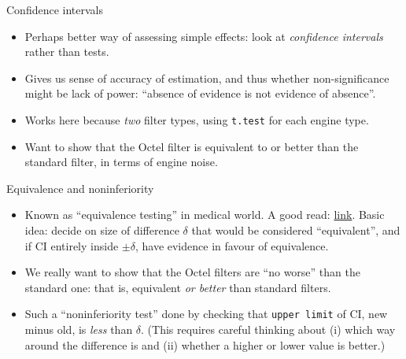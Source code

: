 \documentclass[ignorenonframetext,]{beamer}
\begin{document}
\begin{frame}[fragile]{Confidence intervals}
\protect\hypertarget{confidence-intervals}{}

\begin{itemize}
\item
  Perhaps better way of assessing simple effects: look at
  \emph{confidence intervals} rather than tests.
\item
  Gives us sense of accuracy of estimation, and thus whether
  non-significance might be lack of power: ``absence of evidence is not
  evidence of absence''.
\item
  Works here because \emph{two} filter types, using \texttt{t.test} for
  each engine type.
\item
  Want to show that the Octel filter is equivalent to or better than the
  standard filter, in terms of engine noise.
\end{itemize}

\end{frame}

\begin{frame}[fragile]{Equivalence and noninferiority}
\protect\hypertarget{equivalence-and-noninferiority}{}

\begin{itemize}
\item
  Known as ``equivalence testing'' in medical world. A good read:
  \href{http://www.ncbi.nlm.nih.gov/pmc/articles/PMC3019319/}{link}.
  Basic idea: decide on size of difference \(\delta\) that would be
  considered ``equivalent'', and if CI entirely inside \(\pm \delta\),
  have evidence in favour of equivalence.
\item
  We really want to show that the Octel filters are ``no worse'' than
  the standard one: that is, equivalent \emph{or better} than standard
  filters.
\item
  Such a ``noninferiority test'' done by checking that
  \texttt{upper\ limit} of CI, new minus old, is \emph{less} than
  \(\delta\). (This requires careful thinking about (i) which way around
  the difference is and (ii) whether a higher or lower value is better.)
\end{itemize}

\end{frame}
\end{document}
